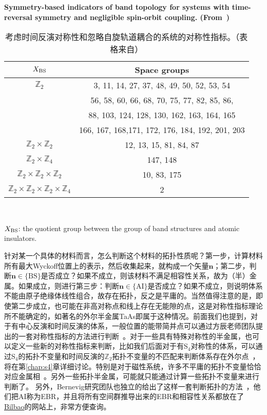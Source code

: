 \begin{table}[h]
    \centering
    \caption{考虑时间反演对称性和忽略自旋轨道耦合的系统的对称性指标。（表格来自\citep{nc_ashvin}）}
    {\bf Symmetry-based indicators of band topology for systems with time-reversal symmetry and negligible spin-orbit coupling. (From~\citep{nc_ashvin})
    \label{tab:Spinless_TRX}}
    \begin{tabular}{c c} \hline 
    $X_{\rm BS}$ & Space groups \\
    \hline
    $\mathbb Z_{2}$  &  3, 11, 14, 27, 37, 48, 49, 50, 52, 53, 54\\
    & 56, 58, 60, 66, 68, 70, 75, 77, 82, 85, 86,\\
    &  88, 103, 124, 128, 130, 162, 163, 164, 165\\
    &  166, 167, 168,171, 172, 176, 184, 192, 201, 203\\
    $\mathbb Z_{2} \times \mathbb Z_{2}$  &  12, 13, 15, 81, 84, 87\\
    $\mathbb Z_{2} \times \mathbb Z_{4}$  &  147, 148\\
    $\mathbb Z_{2} \times \mathbb Z_{2} \times \mathbb Z_{2}$  &  10, 83, 175\\
    $\mathbb Z_{2} \times \mathbb Z_{2} \times \mathbb Z_{2} \times \mathbb Z_{4}$  &  2\\
    \hline
    \end{tabular}\\
    \begin{flushleft}
    $X_{\rm BS}$: the quotient group between the group of band structures and atomic insulators.
    \end{flushleft}
\end{table}

针对某一个具体的材料而言，怎么判断这个材料的拓扑性质呢？第一步，计算材料所有最大Wyckoff位置上的表示，然后收集起来，就构成一个矢量$\mathbf{n}$；第二步，判断$\mathbf{n} \in\{\mathrm{BS}\}$是否成立？如果不成立，则该材料不满足相容性关系，故为（半）金属。如果成立，则进行第三步：判断$\mathbf{n} \in\{\mathrm{AI}\}$是否成立？如果不成立，则说明体系不能由原子绝缘体线性组合，故存在拓扑，反之是平庸的。当然值得注意的是，即使第二步成立，也可能在非高对称点和线上存在无能隙的点，这是对称性指标理论所不能确定的，如著名的外尔半金属TaAs即属于这种情况。前面我们也提到，对于有中心反演和时间反演的体系，一般位置的能带简并点可以通过方辰老师团队提出的一套对称性指标的方法进行判断~\citep{song2018nl}。对于一些具有特殊对称性的半金属，也可以定义一些新的对称性指标来判断，比如我们后面对于有S$_4$对称性的体系，可以通过S$_4$的拓扑不变量和时间反演的$\mathbb{Z}_2$拓扑不变量的不匹配来判断体系存在外尔点~\citep{Qians4}，将在第\ref{chap:s4}章详细讨论。特别是对于磁性系统，许多不平庸的拓扑不变量恰恰对应金属相~\citep{tobedone2019,Peng2021}。另外一些拓扑半金属，可能就只能通过计算一些拓扑不变量来进行判断了。
另外，Bernevig研究团队也独立的给出了这样一套判断拓扑的方法~\citep{tqc2017}，他们把AI称为EBR，并且将所有空间群推导出来的EBR和相容性关系都放在了\href{https://www.cryst.ehu.es/}{Bilbao}的网站上，非常方便查询。



